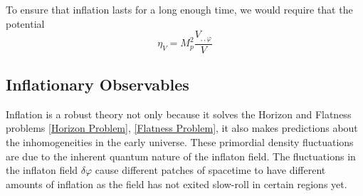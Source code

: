 \documentclass[aps,prd,reprint,preprintnumbers,showpacs,floatfix,nofootinbib,superscript address]{revtex4-2}
\begin{document}

To ensure that inflation lasts for a long enough time, we would require that the potential 
\begin{equation}
    \eta_V = M_p^2  \frac{V_{,,\varphi}}{V} 
\end{equation}
\subsection{Inflationary Observables} \label{Inflationary Observables}
Inflation is a robust theory not only because it solves the Horizon and Flatness problems \ref{Horizon Problem}, \ref{Flatness Problem}, it also makes predictions about the inhomogeneities in the early universe. These primordial density fluctuations are due to the inherent quantum nature of the inflaton field. 
The fluctuations in the inflaton field $\delta\varphi$ cause different patches of spacetime to have different amounts of inflation as the field has not exited slow-roll in certain regions yet. 
\end{document}
